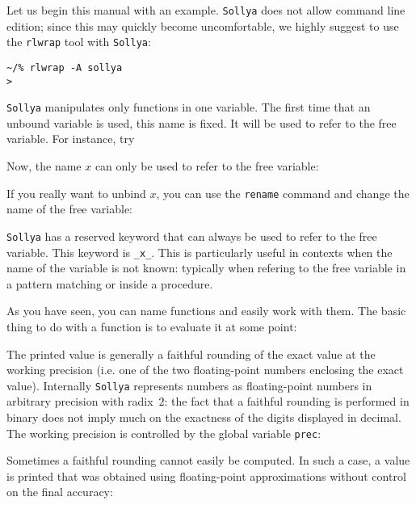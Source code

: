 \documentclass[a4paper]{article}
\newcommand{\com}[1]{\texttt{#1}}
\newcommand{\sollya}{\texttt{Sollya}\xspace}
\newcommand{\rlwrap}{\texttt{rlwrap}\xspace}
\begin{document}
Let us begin this manual with an example. \sollya does not allow command line edition; since this may quickly become uncomfortable, we highly suggest to use the \rlwrap tool with \sollya:

\begin{center}\begin{minipage}{15cm}\begin{Verbatim}[frame=single]
~/% rlwrap -A sollya
>
\end{Verbatim}
\end{minipage}\end{center}

\sollya manipulates only functions in one variable. The first time that an unbound variable is used, this name is fixed. It will be used to refer to the free variable. For instance, try



Now, the name $x$ can only be used to refer to the free variable:



If you really want to unbind $x$, you can use the \com{rename} command and change the name of the free variable:



\sollya has a reserved keyword that can always be used to refer to the free variable. This keyword is \verb|_x_|. This is particularly useful in contexts when the name of the variable is not known: typically when refering to the free variable in a pattern matching or inside a procedure.



As you have seen, you can name functions and easily work with them. The basic thing to do with a function is to evaluate it at some point:



The printed value is generally a faithful rounding of the exact value at the working precision (i.e. one of the two floating-point numbers enclosing the exact value). Internally \sollya represents numbers as floating-point numbers in arbitrary precision with radix~$2$: the fact that a faithful rounding is performed in binary does not imply much on the exactness of the digits displayed in decimal. The working precision is controlled by the global variable \com{prec}:



Sometimes a faithful rounding cannot easily be computed. In such a case, a value is printed that was obtained using floating-point approximations without control on the final accuracy:
\end{document}
